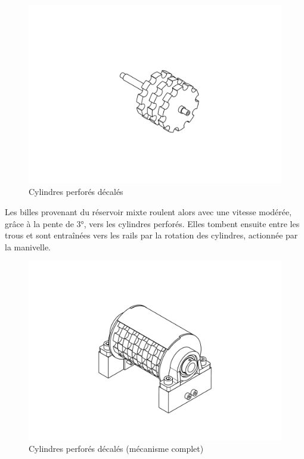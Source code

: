 \begin{figure}
    \centering
    \includegraphics[width=\textwidth]{Graphics/Images_concepts_Leon/ROUE_SUR_BARRE.pdf}
    \caption{Cylindres perforés décalés}
\end{figure}

Les billes provenant du réservoir mixte roulent alors avec une vitesse modérée, grâce à la pente de \ang{3}, vers les cylindres perforés. Elles tombent ensuite entre les trous et sont entraînées vers les rails par la rotation des cylindres, actionnée par la manivelle.

\begin{figure}
    \centering
    \includegraphics[width=\textwidth]{Graphics/Images_concepts_Leon/ASSEMBLAGE_LOURD.pdf}
    \caption{Cylindres perforés décalés (mécanisme complet)}
\end{figure}


